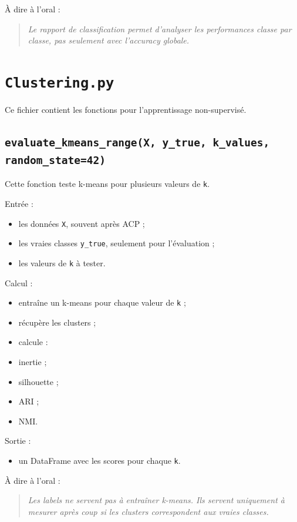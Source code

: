 \documentclass[11pt,a4paper]{article}
\begin{document}
À dire à l'oral :

\begin{quote}
\itshape Le rapport de classification permet d'analyser les performances classe par classe, pas seulement avec l'accuracy globale.
\end{quote}

\section{\texttt{Clustering.py}}

Ce fichier contient les fonctions pour l'apprentissage non-supervisé.

\subsection{\texttt{evaluate\_kmeans\_range(X, y\_true, k\_values, random\_state=42)}}

Cette fonction teste k-means pour plusieurs valeurs de \texttt{k}.

Entrée :

\begin{itemize}
\item les données \texttt{X}, souvent après ACP ;
\item les vraies classes \texttt{y\_true}, seulement pour l'évaluation ;
\item les valeurs de \texttt{k} à tester.
\end{itemize}

Calcul :

\begin{itemize}
\item entraîne un k-means pour chaque valeur de \texttt{k} ;
\item récupère les clusters ;
\item calcule :
\item inertie ;
\item silhouette ;
\item ARI ;
\item NMI.
\end{itemize}

Sortie :

\begin{itemize}
\item un DataFrame avec les scores pour chaque \texttt{k}.
\end{itemize}

À dire à l'oral :

\begin{quote}
\itshape Les labels ne servent pas à entraîner k-means. Ils servent uniquement à mesurer après coup si les clusters correspondent aux vraies classes.
\end{quote}
\end{document}
